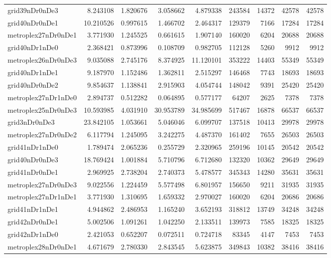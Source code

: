 \documentclass[../../../thesis.tex]{subfiles}
\begin{document}
\begin{longtable}{|l|r|r|r|r|r|r|r|r|}
grid39nDr0nDe3 & 8.243108 & 1.820676 & 3.058662 & 4.879338 & 243584 & 14372 & 42578 & 42578 \\
grid40nDr0nDe1 & 10.210526 & 0.997615 & 1.466702 & 2.464317 & 129379 & 7166 & 17284 & 17284 \\
metroplex27nDr0nDe1 & 3.771930 & 1.245525 & 0.661615 & 1.907140 & 160020 & 6204 & 20688 & 20688 \\
grid40nDr1nDe0 & 2.368421 & 0.873996 & 0.108709 & 0.982705 & 112128 & 5260 & 9912 & 9912 \\
metroplex26nDr0nDe3 & 9.035088 & 2.745176 & 8.374925 & 11.120101 & 353222 & 14403 & 55349 & 55349 \\
grid40nDr1nDe1 & 9.187970 & 1.152486 & 1.362811 & 2.515297 & 146468 & 7743 & 18693 & 18693 \\
grid40nDr0nDe2 & 9.854637 & 1.138841 & 2.915903 & 4.054744 & 148042 & 9391 & 25420 & 25420 \\
metroplex27nDr1nDe0 & 2.894737 & 0.512282 & 0.064895 & 0.577177 & 64207 & 2625 & 7378 & 7378 \\
metroplex25nDr0nDe3 & 10.593985 & 4.031910 & 30.953789 & 34.985699 & 517467 & 16878 & 66537 & 66537 \\
grid3nDr0nDe3 & 23.842105 & 1.053661 & 5.046046 & 6.099707 & 137518 & 10413 & 29978 & 29978 \\
metroplex27nDr0nDe2 & 6.117794 & 1.245095 & 3.242275 & 4.487370 & 161402 & 7655 & 26503 & 26503 \\
grid41nDr1nDe0 & 1.789474 & 2.065236 & 0.255729 & 2.320965 & 259196 & 10145 & 20542 & 20542 \\
grid40nDr0nDe3 & 18.769424 & 1.001884 & 5.710796 & 6.712680 & 132320 & 10362 & 29649 & 29649 \\
grid41nDr0nDe1 & 2.969925 & 2.738204 & 2.740373 & 5.478577 & 345343 & 14280 & 35631 & 35631 \\
metroplex27nDr0nDe3 & 9.022556 & 1.224459 & 5.577498 & 6.801957 & 156650 & 9211 & 31935 & 31935 \\
metroplex27nDr1nDe1 & 3.771930 & 1.310695 & 1.659332 & 2.970027 & 160020 & 6204 & 20686 & 20686 \\
grid41nDr1nDe1 & 4.944862 & 2.486953 & 1.165240 & 3.652193 & 318812 & 13749 & 34248 & 34248 \\
grid42nDr0nDe1 & 5.002506 & 1.091261 & 1.042250 & 2.133511 & 139973 & 7585 & 18325 & 18325 \\
grid42nDr1nDe0 & 2.421053 & 0.652207 & 0.072511 & 0.724718 & 83345 & 4147 & 7453 & 7453 \\
metroplex28nDr0nDe1 & 4.671679 & 2.780330 & 2.843545 & 5.623875 & 349843 & 10382 & 38416 & 38416 \\

\end{longtable}
\end{document}
